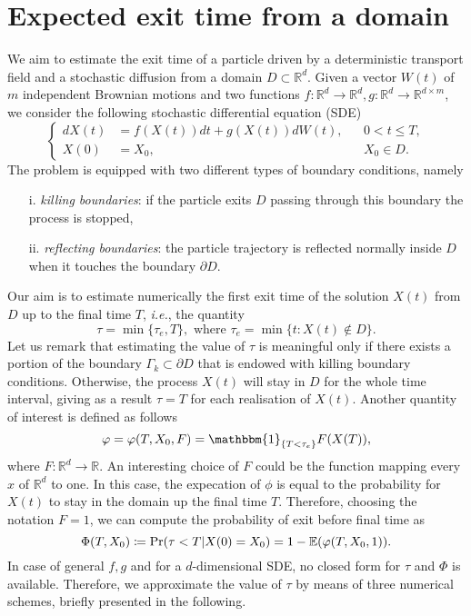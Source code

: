 \section{Expected exit time from a domain}
We aim to estimate the exit time of a particle driven by a deterministic transport field and a stochastic diffusion from a domain $D \subset \mathbb{R}^d$. Given a vector $W(t)$ of $m$ independent Brownian motions and two functions $f\colon \mathbb{R}^d \rightarrow \mathbb{R}^d, g \colon \mathbb{R}^d \rightarrow \mathbb{R}^{d\times m}$, we consider the following stochastic differential equation (SDE)
\begin{equation}\label{eq:GeneralModel}
\left \{
\begin{aligned}
	dX(t) &= f(X(t)) dt + g(X(t))dW(t), && 0 < t \leq T, \\
	X(0)  &= X_0, && X_0 \in D.
\end{aligned} \right .
\end{equation}
The problem is equipped with two different types of boundary conditions, namely
\begin{itemize}
	\item[i.]  \textit{killing boundaries}: if the particle exits $D$ passing through this boundary the process is stopped,
	\item[ii.] \textit{reflecting boundaries}: the particle trajectory is reflected normally inside $D$ when it touches the boundary $\partial D$.
\end{itemize}
Our aim is to estimate numerically the first exit time of the solution $X(t)$ from $D$ up to the final time $T$, \textit{i.e.}, the quantity
\begin{equation}\label{eq:GeneralTau}
	\tau = \min\{\tau_e,T\}, \text{ where } \tau_e = \min\{t\colon X(t)\notin D\}.
\end{equation}
Let us remark that estimating the value of $\tau$ is meaningful only if there exists a portion of the boundary $\Gamma_k \subset \partial D$ that is endowed with killing boundary conditions. Otherwise, the process $X(t)$ will stay in $D$ for the whole time interval, giving as a result $\tau = T$ for each realisation of $X(t)$. Another quantity of interest is defined as follows
\begin{equation}\label{eq:GeneralPhi}
	\phi = \phi(T,X_0,F) = \mathbbm{1}_{\{T < \tau_e\}}F(X(T)),
\end{equation}
where $F\colon \mathbb{R}^d \rightarrow \mathbb{R}$. An interesting choice of $F$ could be the function mapping every $x$ of $\mathbb{R}^d$ to one. In this case, the expecation of $\phi$ is equal to the probability for $X(t)$ to stay in the domain up the final time $T$. Therefore, choosing the notation $F = 1$, we can compute the probability of exit before final time as
\begin{equation}\label{eq:ExitProb}
	\Phi(T,X_0) \coloneqq \Pr(\tau < T | X(0) = X_0) = 1 - \mathbb{E}(\varphi(T,X_0,1)). 
\end{equation}
In case of general $f,g$ and for a $d$-dimensional SDE, no closed form for $\tau$ and $\Phi$ is available. Therefore, we approximate the value of $\tau$ by means of three numerical schemes, briefly presented in the following.





